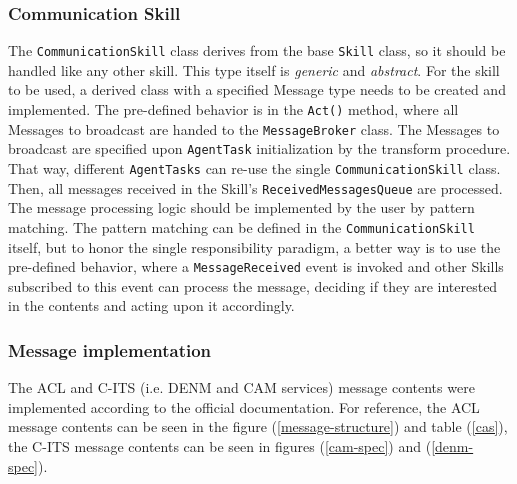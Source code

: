 \documentclass[main.tex]{subfiles}
\begin{document}
\subsubsection{Communication Skill}

The \texttt{CommunicationSkill} class derives from the base \texttt{Skill} class, so it should
be handled like any other skill. This type itself is \emph{generic} and \emph{abstract}. For
the skill to be used, a derived class with a specified Message type needs to be created and
implemented. The pre-defined behavior is in the \texttt{Act()} method, where all Messages to
broadcast are handed to the \texttt{MessageBroker} class.  The Messages to broadcast are
specified upon \texttt{AgentTask} initialization by the transform procedure. That way,
different \texttt{AgentTasks} can re-use the single \texttt{CommunicationSkill} class.  Then,
all messages received in the Skill's \texttt{ReceivedMessagesQueue} are processed. The message
processing logic should be implemented by the user by pattern matching. The pattern matching
can be defined in the \texttt{CommunicationSkill} itself, but to honor the single
responsibility paradigm, a better way is to use the pre-defined behavior, where a
\texttt{MessageReceived} event is invoked and other Skills subscribed to this event can process
the message, deciding if they are interested in the contents and acting upon it accordingly. 

\subsubsection{Message implementation}

The ACL and C-ITS (i.e. DENM and CAM services) message contents were implemented according to 
the official documentation. For reference, the ACL message contents can be seen in the figure
(\ref{message-structure}) and table (\ref{cas}), the C-ITS message contents can be seen 
in figures (\ref{cam-spec}) and (\ref{denm-spec}).
\end{document}
